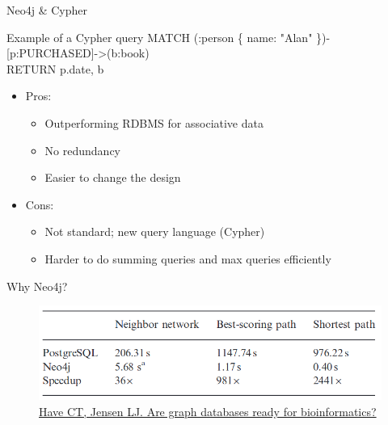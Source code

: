 \documentclass{beamer}
\begin{document}
\begin{frame}{Neo4j \& Cypher}
\begin{block}{Example of a Cypher query}
MATCH (:person \{ name: "Alan" \})-[p:PURCHASED]-\textgreater(b:book) \\
RETURN p.date, b
\end{block}
\begin{itemize}
    \item Pros:
    \begin{itemize}
        \item Outperforming RDBMS for associative data
        \item No redundancy
        \item Easier to change the design
    \end{itemize}
    \vfill
    \item Cons:
    \begin{itemize}
        \item Not standard; new query language (Cypher)
        \item Harder to do summing queries and max queries efficiently
    \end{itemize}
\end{itemize}
\end{frame}

\begin{frame}{Why Neo4j?}
    \begin{figure}
        \centering
        \includegraphics[width=0.7\linewidth]{graph-dbs-benchmark.png}
        \caption{\href{https://www.ncbi.nlm.nih.gov/pmc/articles/PMC3842757/}{Have CT, Jensen LJ. Are graph databases ready for bioinformatics?}}
    \end{figure}
\end{frame}

\end{document}
